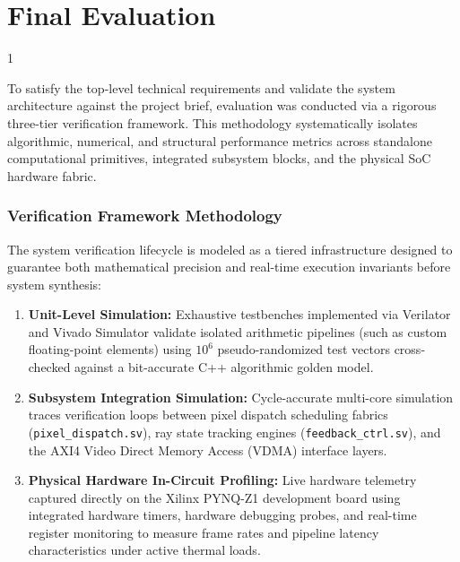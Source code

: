 \doublespacing %

\chapter{Final Evaluation}
\label{ch:evaluation}

\begin{spacing}{1} %
\minitoc %
\end{spacing} %
\thesisspacing %

To satisfy the top-level technical requirements and validate the system architecture against the project brief, evaluation was conducted via a rigorous three-tier verification framework. This methodology systematically isolates algorithmic, numerical, and structural performance metrics across standalone computational primitives, integrated subsystem blocks, and the physical SoC hardware fabric.

\subsection{Verification Framework Methodology}
\label{sec:verif_methodology}
The system verification lifecycle is modeled as a tiered infrastructure designed to guarantee both mathematical precision and real-time execution invariants before system synthesis:
\begin{enumerate}
    \item \textbf{Unit-Level Simulation:} Exhaustive testbenches implemented via Verilator and Vivado Simulator validate isolated arithmetic pipelines (such as custom floating-point elements) using $10^6$ pseudo-randomized test vectors cross-checked against a bit-accurate C++ algorithmic golden model.
    \item \textbf{Subsystem Integration Simulation:} Cycle-accurate multi-core simulation traces verification loops between pixel dispatch scheduling fabrics (\texttt{pixel\_dispatch.sv}), ray state tracking engines (\texttt{feedback\_ctrl.sv}), and the AXI4 Video Direct Memory Access (VDMA) interface layers.
    \item \textbf{Physical Hardware In-Circuit Profiling:} Live hardware telemetry captured directly on the Xilinx PYNQ-Z1 development board using integrated hardware timers, hardware debugging probes, and real-time register monitoring to measure frame rates and pipeline latency characteristics under active thermal loads.
\end{enumerate}

